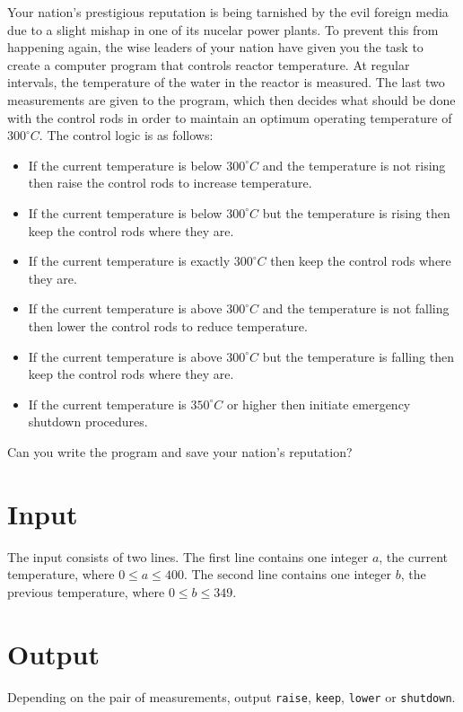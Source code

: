 
Your nation's prestigious reputation is being tarnished by the evil foreign
media due to a slight mishap in one of its nucelar power plants.
To prevent this from happening again, the wise leaders of your nation have
given you the task to create a computer program that controls reactor temperature.
At regular intervals, the temperature of the water in the reactor is measured.
The last two measurements are given to the program, which then decides what should
be done with the control rods in order to maintain an optimum operating temperature
of $300^\circ C$. The control logic is as follows:

\begin{itemize}
    \item If the current temperature is below $300^\circ C$ and the temperature is not rising then raise the control rods to increase temperature.
    \item If the current temperature is below $300^\circ C$ but the temperature is rising then keep the control rods where they are.
    \item If the current temperature is exactly $300^\circ C$ then keep the control rods where they are.
    \item If the current temperature is above $300^\circ C$ and the temperature is not falling then lower the control rods to reduce temperature.
    \item If the current temperature is above $300^\circ C$ but the temperature is falling then keep the control rods where they are.
    \item If the current temperature is $350^\circ C$ or higher then initiate emergency shutdown procedures.
\end{itemize}

Can you write the program and save your nation's reputation?

\section*{Input}
The input consists of two lines.
The first line contains one integer $a$, the current temperature, where $0 \leq a \leq 400$.
The second line contains one integer $b$, the previous temperature, where $0 \leq b \leq 349$.

\section*{Output}
Depending on the pair of measurements, output \texttt{raise}, \texttt{keep}, \texttt{lower} or \texttt{shutdown}.
